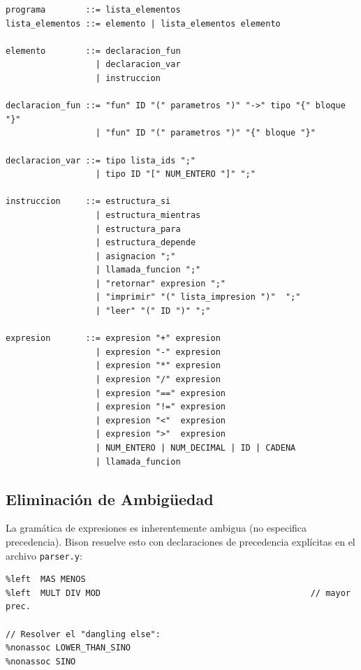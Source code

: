 \begin{lstlisting}[style=cstyle, caption={Extracto de la gramática en BNF — parser.y}, language={}]
programa        ::= lista_elementos
lista_elementos ::= elemento | lista_elementos elemento

elemento        ::= declaracion_fun
                  | declaracion_var
                  | instruccion

declaracion_fun ::= "fun" ID "(" parametros ")" "->" tipo "{" bloque "}"
                  | "fun" ID "(" parametros ")" "{" bloque "}"

declaracion_var ::= tipo lista_ids ";"
                  | tipo ID "[" NUM_ENTERO "]" ";"

instruccion     ::= estructura_si
                  | estructura_mientras
                  | estructura_para
                  | estructura_depende
                  | asignacion ";"
                  | llamada_funcion ";"
                  | "retornar" expresion ";"
                  | "imprimir" "(" lista_impresion ")"  ";"
                  | "leer" "(" ID ")" ";"

expresion       ::= expresion "+" expresion
                  | expresion "-" expresion
                  | expresion "*" expresion
                  | expresion "/" expresion
                  | expresion "==" expresion
                  | expresion "!=" expresion
                  | expresion "<"  expresion
                  | expresion ">"  expresion
                  | NUM_ENTERO | NUM_DECIMAL | ID | CADENA
                  | llamada_funcion
\end{lstlisting}

\subsection{Eliminación de Ambigüedad}

La gramática de expresiones es inherentemente ambigua (no especifica precedencia). Bison resuelve esto con declaraciones de precedencia explícitas en el archivo \texttt{parser.y}:

\begin{lstlisting}[style=cstyle, caption={Declaraciones de precedencia en parser.y}]
%left  IGUAL DIFERENTE MENOR MAYOR MENOR_IGUAL MAYOR_IGUAL  // menor prec.
%left  MAS MENOS
%left  MULT DIV MOD                                          // mayor prec.

// Resolver el "dangling else":
%nonassoc LOWER_THAN_SINO
%nonassoc SINO
\end{lstlisting}

